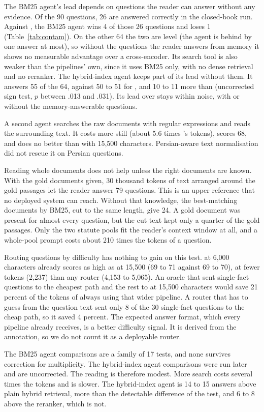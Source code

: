 The BM25 agent's lead depends on questions the reader can answer without any evidence. Of the 90 questions, 26 are answered correctly in the closed-book run. Against \hr{}, the BM25 agent wins 4 of those 26 questions and loses 1 (Table~\ref{tab:contam}). On the other 64 the two are level (the agent is behind by one answer at most), so without the questions the reader answers from memory it shows no measurable advantage over a cross-encoder. Its search tool is also weaker than the pipelines' own, since it uses BM25 only, with no dense retrieval and no reranker. The hybrid-index agent keeps part of its lead without them. It answers 55 of the 64, against 50 to 51 for \hr{}, and 10 to 11 more than \hybrid{} (uncorrected sign test, $p$ between .013 and .031). Its lead over \hr{} stays within noise, with or without the memory-answerable questions.

A second agent searches the raw documents with regular expressions and reads the surrounding text. It costs more still (about 5.6 times \hybrid's tokens), scores 68, and does no better than \hybrid{} with 15,500 characters. Persian-aware text normalisation did not rescue it on Persian questions.

Reading whole documents does not help unless the right documents are known. With the gold documents given, 30 thousand tokens of text arranged around the gold passages let the reader answer 79 questions. This is an upper reference that no deployed system can reach. Without that knowledge, the best-matching documents by BM25, cut to the same length, give 24. A gold document was present for almost every question, but the cut text kept only a quarter of the gold passages. Only the two statute pools fit the reader's context window at all, and a whole-pool prompt costs about 210 times the tokens of a \hybrid{} question.

Routing questions by difficulty has nothing to gain on this test. \hr{} at 6,000 characters already scores as high as \hr{} at 15,500 (69 to 71 against 69 to 70), at fewer tokens (2,237) than any router (4,153 to 5,065). An oracle that sent single-fact questions to the cheapest path and the rest to \hr{} at 15,500 characters would save 21 percent of the tokens of always using that wider pipeline. A router that has to guess from the question text sent only 8 of the 30 single-fact questions to the cheap path, so it saved 4 percent. The expected answer format, which every pipeline already receives, is a better difficulty signal. It is derived from the annotation, so we do not count it as a deployable router.

The BM25 agent comparisons are a family of 17 tests, and none survives correction for multiplicity. The hybrid-index agent comparisons were run later and are uncorrected. The reading is therefore modest. More search costs several times the tokens and is slower. The hybrid-index agent is 14 to 15 answers above plain hybrid retrieval, more than the detectable difference of the test, and 6 to 8 above the reranker, which is not.
